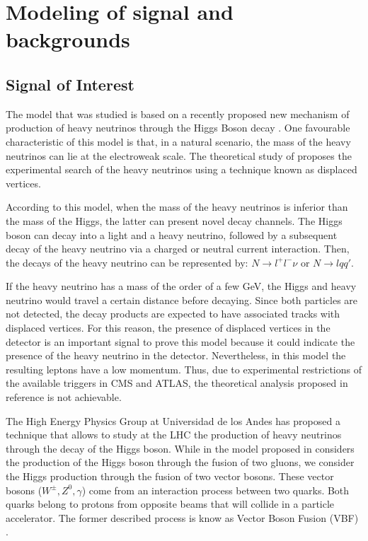 \chapter{Modeling of signal and backgrounds}
\label{Model_chapter}
 
\section{Signal of Interest}

The model that was studied is based on a recently proposed new mechanism of production of heavy neutrinos through the Higgs Boson decay \cite{Seesaw Mechanism with displaced vertices}. One
favourable characteristic of this model is that, in a natural scenario, the mass of the heavy neutrinos can lie at the electroweak scale. The theoretical study of \cite{Seesaw Mechanism with displaced vertices}
proposes the experimental search of the heavy neutrinos using a technique known as displaced vertices.

According to this model, when the mass of the heavy neutrinos is inferior than the mass of the Higgs, the latter can present novel decay channels. The Higgs boson can decay into a light and a heavy
neutrino, followed by a subsequent decay of the heavy neutrino via a charged or neutral current interaction. Then, the decays of the heavy neutrino can be represented by: $N \rightarrow l^+ l^- \nu$
or $N \rightarrow l q q'$. 

If the heavy neutrino has a mass of the order of a few GeV, the Higgs and heavy neutrino would travel a certain distance before decaying. Since both particles are not detected, the decay products 
are expected to have associated tracks with displaced vertices. For this reason, the presence of displaced vertices in the detector is an important signal to prove this model because it could 
indicate the presence of the heavy neutrino in the detector. Nevertheless, in this model the resulting leptons have a low momentum. Thus, due to experimental restrictions of the available triggers
in CMS and ATLAS, the theoretical analysis proposed in reference \cite{Seesaw Mechanism with displaced vertices} is not achievable.  

The High Energy Physics Group at Universidad de los Andes has proposed a technique that allows to study at the LHC the production of heavy neutrinos through the decay of the Higgs boson. While in 
the model proposed in \cite{Seesaw Mechanism with displaced vertices} considers the production of the Higgs boson through the fusion of two gluons, we consider the Higgs production through the fusion
of two vector bosons. These vector bosons ($W^{\pm},Z^0,\gamma$) come from an interaction process between two quarks. Both quarks belong to protons from opposite beams that will collide in a 
particle accelerator. The former described process is know as Vector Boson Fusion (VBF) \cite{VBF processes}. 

